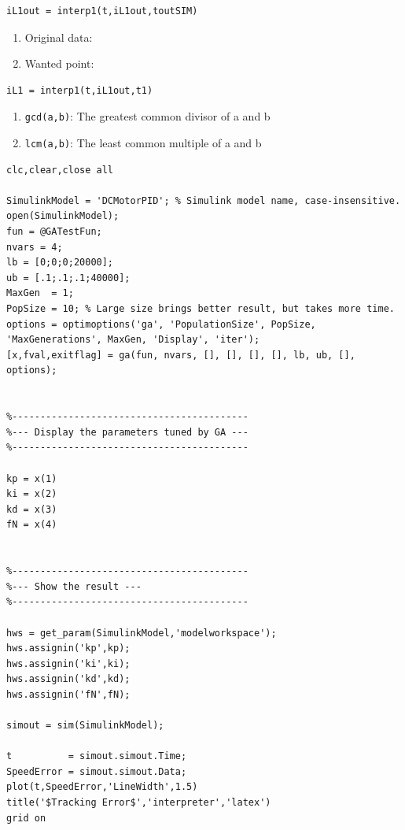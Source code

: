 \documentclass[8pt]{innovativeinnovation-cheatsheet}
\newcommand{\myinline}[1]{{\color{innoinnored}\bfseries\ttfamily{#1}}}
\begin{document}
\begin{multicols*}{3}
\begin{lstlisting}
iL1out = interp1(t,iL1out,toutSIM)
\end{lstlisting}


\begin{enumerate}[label=$\bullet$,leftmargin=*,nosep]
    \item Original data: \myinline{(t,iL1out)}
    \item Wanted point: \myinline{(t1,iL1)}
\end{enumerate}

\begin{lstlisting}
iL1 = interp1(t,iL1out,t1)
\end{lstlisting}



\begin{enumerate}[label=$\bullet$,leftmargin=*,nosep]
    \item \lstinline!gcd(a,b)!: The greatest common divisor of a and b 
    \item \lstinline!lcm(a,b)!: The least common multiple of a and b
\end{enumerate}

\begin{lstlisting}
clc,clear,close all

SimulinkModel = 'DCMotorPID'; % Simulink model name, case-insensitive.
open(SimulinkModel);
fun = @GATestFun;
nvars = 4;
lb = [0;0;0;20000];
ub = [.1;.1;.1;40000];
MaxGen  = 1;
PopSize = 10; % Large size brings better result, but takes more time.
options = optimoptions('ga', 'PopulationSize', PopSize, 'MaxGenerations', MaxGen, 'Display', 'iter');
[x,fval,exitflag] = ga(fun, nvars, [], [], [], [], lb, ub, [], options);


%------------------------------------------
%--- Display the parameters tuned by GA ---
%------------------------------------------

kp = x(1)
ki = x(2)
kd = x(3)
fN = x(4)


%------------------------------------------
%--- Show the result ---
%------------------------------------------

hws = get_param(SimulinkModel,'modelworkspace');
hws.assignin('kp',kp);
hws.assignin('ki',ki);
hws.assignin('kd',kd);
hws.assignin('fN',fN);

simout = sim(SimulinkModel);

t          = simout.simout.Time;
SpeedError = simout.simout.Data;
plot(t,SpeedError,'LineWidth',1.5)
title('$Tracking Error$','interpreter','latex')
grid on


\end{lstlisting}
\end{multicols*}
\end{document}
